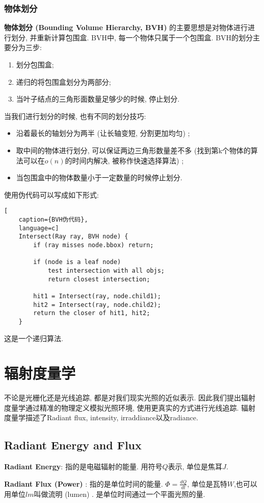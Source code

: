 \documentclass[openany]{progbookcn}
\begin{document}
\subsection{物体划分}
\textbf{物体划分 (Bounding Volume Hierarchy, BVH) }的主要思想是对物体进行进行划分, 并重新计算包围盒. BVH中, 每一个物体只属于一个包围盒. BVH的划分主要分为三步: 
\begin{enumerate}
	\item 划分包围盒; 
	\item 递归的将包围盒划分为两部分; 
	\item 当叶子结点的三角形面数量足够少的时候, 停止划分. 
\end{enumerate}
当我们进行划分的时候, 也有不同的划分技巧: 
\begin{itemize}
	\item 沿着最长的轴划分为两半 (让长轴变短, 分割更加均匀) ; 
	\item 取中间的物体进行划分, 可以保证两边三角形数量差不多 (找到第k个物体的算法可以在$o(n)$的时间内解决, 被称作快速选择算法) ; 
	\item 当包围盒中的物体数量小于一定数量的时候停止划分. 
\end{itemize}
使用伪代码可以写成如下形式: 
\begin{lstlisting}[
	caption={BVH伪代码},
	language=c]
	Intersect(Ray ray, BVH node) {
		if (ray misses node.bbox) return;
		
		if (node is a leaf node)
			test intersection with all objs;
			return closest intersection;
		
		hit1 = Intersect(ray, node.child1);
		hit2 = Intersect(ray, node.child2);
		return the closer of hit1, hit2;
	}
\end{lstlisting}
这是一个递归算法. 

\chapter{辐射度量学}
不论是光栅化还是光线追踪, 都是对我们现实光照的近似表示. 因此我们提出辐射度量学通过精准的物理定义模拟光照环境, 使用更真实的方式进行光线追踪. 辐射度量学描述了Radiant flux, intensity, irraddiance以及radiance. 

\section{Radiant Energy and Flux}
\textbf{Radiant Energy}: 指的是电磁辐射的能量. 用符号$Q$表示, 单位是焦耳$J$.

\textbf{Radiant Flux (Power) }: 指的是单位时间的能量. $\Phi=\frac{dQ}{dt}$, 单位是瓦特$W$,也可以用单位$lm$叫做流明 (lumen) . 是单位时间通过一个平面光照的量. 
\end{document}
